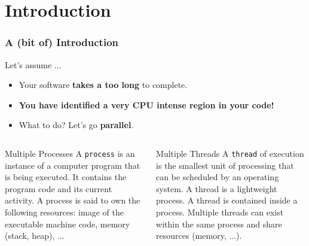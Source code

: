 \documentclass[9pt,pdftex]{beamer}
\begin{document}
\section[Intro]{Introduction}
\begin{frame}
\frametitle{A (bit of) Introduction}
\begin{block}{Let's assume ...}
  \begin{center}
    \begin{itemize}
    \item Your software \textbf{takes a too long} to complete.
    \item \textbf{You have identified a very CPU intense region in your code!} \\
    \item What to do? Let's go \textbf{parallel}.
    \end{itemize}
  \end{center}
\end{block}
\vfill
\begin{columns}[t]
  \begin{column}{.45\textwidth}
    \begin{block}{Multiple Processes}
      A \texttt{process}\cite{Wikipedia:Processes} is an instance of a computer program that is being executed. 
      It contains the program code and its current activity. A process is said to own the following resources: image of the executable machine code, memory (stack, heap), ...
    \end{block}
  \end{column}
\hfill
  \begin{column}{.45\textwidth}
    \begin{block}{Multiple Threads}
      A \texttt{thread}\cite{Wikipedia:Threads} of execution is the smallest unit of processing that can be scheduled by an operating system.
      A thread is a lightweight process. A thread is contained inside a process. 
      Multiple threads can exist within the same process and share resources (memory, ...).
    \end{block}
  \end{column}
\end{columns}
\vfill
\end{frame}
\end{document}
